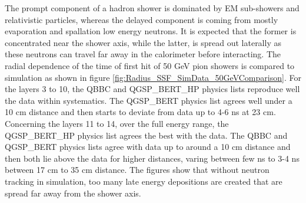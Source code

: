 \documentclass{JINST}
\begin{document}
The prompt component of a hadron shower is dominated by EM sub-showers and relativistic particles, whereas the delayed component is coming from mostly evaporation and spallation low energy neutrons. It is expected that the former is concentrated near the shower axis, while the latter, is spread out laterally as these neutrons can travel far away in the calorimeter before interacting. The radial dependence of the time of first hit of 50 GeV pion showers is compared to simulation as shown in figure \ref{fig:Radius_SSF_SimData_50GeVComparison}. For the layers 3 to 10, the QBBC and QGSP\_BERT\_HP physics lists reproduce well the data within systematics. The QGSP\_BERT physics list agrees well under a 10 cm distance and then starts to deviate from data up to 4-6 ns at 23 cm. Concerning the layers 11 to 14, over the full energy range, the QGSP\_BERT\_HP physics list agrees the best with the data. The QBBC and QGSP\_BERT physics lists agree with data up to around a 10 cm distance and then both lie above the data for higher distances, varing between few ns to 3-4 ns between 17 cm to 35 cm distance. The figures show that without neutron tracking in simulation, too many late energy depositions are created that are spread far away from the shower axis.
\end{document}
